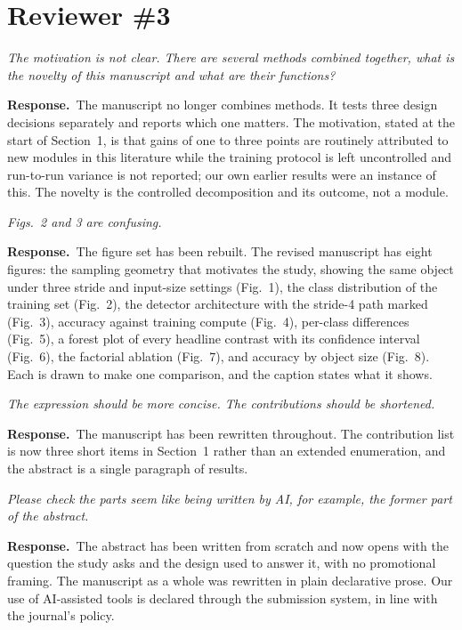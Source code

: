\documentclass[11pt, a4paper]{article}
\newcommand{\point}[1]{\medskip\noindent\textit{#1}\par}
\newcommand{\reply}{\textbf{Response.}\ }
\begin{document}
\section*{Reviewer \#3}

\point{The motivation is not clear. There are several methods combined together,
what is the novelty of this manuscript and what are their functions?}

\reply The manuscript no longer combines methods. It tests three design decisions
separately and reports which one matters. The motivation, stated at the start of
Section~1, is that gains of one to three points are routinely attributed to new
modules in this literature while the training protocol is left uncontrolled and
run-to-run variance is not reported; our own earlier results were an instance of
this. The novelty is the controlled decomposition and its outcome, not a module.

\point{Figs.~2 and 3 are confusing.}

\reply The figure set has been rebuilt. The revised manuscript has eight figures:
the sampling geometry that motivates the study, showing the same object under
three stride and input-size settings (Fig.~1), the class distribution of the
training set (Fig.~2), the detector
architecture with the stride-4 path marked (Fig.~3), accuracy against training
compute (Fig.~4), per-class differences (Fig.~5), a forest plot of every headline
contrast with its confidence interval (Fig.~6), the factorial ablation (Fig.~7),
and accuracy by object size (Fig.~8). Each is drawn to make one comparison, and
the caption states what it shows.

\point{The expression should be more concise. The contributions should be
shortened.}

\reply The manuscript has been rewritten throughout. The contribution list is now
three short items in Section~1 rather than an extended enumeration, and the
abstract is a single paragraph of results.

\point{Please check the parts seem like being written by AI, for example, the
former part of the abstract.}

\reply The abstract has been written from scratch and now opens with the question
the study asks and the design used to answer it, with no promotional framing. The
manuscript as a whole was rewritten in plain declarative prose. Our use of
AI-assisted tools is declared through the submission system, in line with the
journal's policy.
\end{document}

